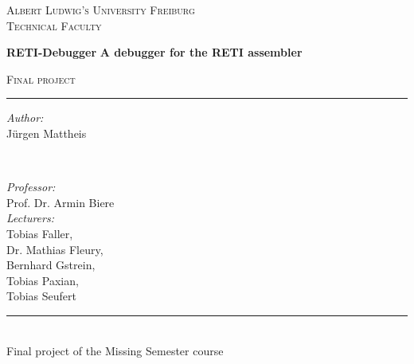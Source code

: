 \begin{titlepage}
  \vspace{1cm}
  \center
  \textsc{\LARGE Albert Ludwig's University Freiburg}\\[0.5cm]
  \textsc{\Large Technical Faculty}\\[2.0cm]

  \vspace{1cm}

	\begin{titlebox}{\center \huge \bfseries RETI-Debugger}
		\centering
		\bfseries \Large A debugger for the RETI assembler
	\end{titlebox}

  \textsc{\large Final project}\\
  \rule{\linewidth}{0.1mm}

  \vspace{3cm}

  \begin{minipage}[t]{0.45\textwidth}
    \begin{flushleft} \large
      \emph{Author:}\\
      Jürgen Mattheis
    \end{flushleft}
  \end{minipage}
  ~
  \begin{minipage}[t]{0.45\textwidth}
    \begin{flushright} \large
      \emph{Professor:}\\
      Prof. Dr. Armin Biere\\[0.64cm]
      \emph{Lecturers:}\\
      Tobias Faller,\\ 
      Dr. Mathias Fleury,\\
      Bernhard Gstrein,\\
      Tobias Paxian,\\
      Tobias Seufert
    \end{flushright}
  \end{minipage}

  \vspace{2.5cm}
  \rule{11cm}{0.1mm}\\[0.25cm]
  \large{Final project of the Missing Semester course}
\end{titlepage}
